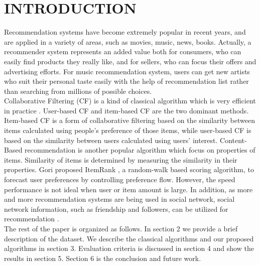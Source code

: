 \documentclass{sig-alternate}
\begin{document}
\section{INTRODUCTION}
Recommendation systems \cite{rs} have become extremely popular in recent years, and are applied in a variety of areas, such as movies, music, news, books. Actually, a recommender system represents an added value both for consumers, who can easily find products they really like, and for sellers, who can focus their offers and advertising efforts. For music recommendation system,  users can get new artists who suit their personal taste easily with the help of recommendation list rather than searching from millions of possible choices.\\
\indent Collaborative Filtering (CF) is a kind of classical algorithm which is very efficient in practice \cite{amazon}. User-based CF and item-based CF are the two dominant methods. Item-based CF \cite{itembase} is a form of collaborative filtering based on the similarity between items calculated using people's preference of those items, while user-based CF is based on the similarity between users calculated using users' interest. Content-Based recommendation \cite{contentbase} is another popular algorithm which focus on properties of items. Similarity of items is determined by measuring the similarity in their properties. Gori proposed ItemRank \cite{itemrank}, a random-walk based scoring algorithm,  to forecast user preferences by controlling preference flow. However, the speed performance is not ideal when user or item amount is large. 
In addition, as more and more recommendation systems are being used in social network, social network information, such as friendship and followers, can be utilized for recommendation \cite{socialmodel}.\\
\indent The rest of the paper is organized as follows. In section 2 we provide a brief description of the dataset. We describe the classical algorithms and our proposed algorithms in section 3. Evaluation criteria is discussed in section 4 and show the results in section 5. Section 6 is the conclusion and future work.
\end{document}
